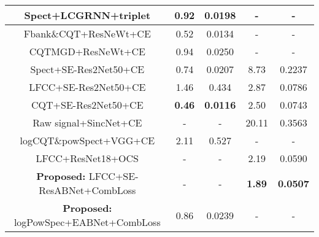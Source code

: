 \documentclass[a4paper]{article}
\begin{document}
\begin{table*}[t]
\begin{tabular}{|c|c|c|c|c|}
Spect+LCGRNN+triplet                                                      & 0.92         & 0.0198 & -          & - \\ \hline
Fbank\&CQT+ResNeWt+CE \cite{33cheng2019replay}                                                     & 0.52 & 0.0134 & - & -   \\ \hline
CQTMGD+ResNeWt+CE \cite{33cheng2019replay}                                                     & 0.94          & 0.0250 & -          & - \\ \hline
Spect+SE-Res2Net50+CE \cite{23li2021replay}                                                     & 0.74          & 0.0207 & 8.73          & 0.2237   \\ \hline
LFCC+SE-Res2Net50+CE \cite{23li2021replay}                                                    & 1.46         & 0.434 & 2.87          & 0.0786 \\ \hline
CQT+SE-Res2Net50+CE \cite{23li2021replay}                                                     & \textbf{0.46}          & \textbf{0.0116} & 2.50          & 0.0743 \\ \hline
Raw signal+SincNet+CE \cite{16zeinali2019detecting}                                                    & -          & - & 20.11          & 0.3563 \\ \hline
logCQT\&powSpect+VGG+CE \cite{16zeinali2019detecting}                                                     & 2.11          & 0.527 & -          & - \\ \hline
LFCC+ResNet18+OCS \cite{24zhang2021one}
                                                     & -          & - & 2.19          & 0.0590 \\ \hline
\textbf{Proposed:} LFCC+SE-ResABNet+CombLoss                                & -          & - & \textbf{1.89}          & \textbf{0.0507}   \\ \hline
\textbf{Proposed:} logPowSpec+EABNet+CombLoss                                & 0.86          & 0.0239 & -          & -   \\ \hline
\end{tabular}
\label{tab:my-table}
\end{table*}
\end{document}

